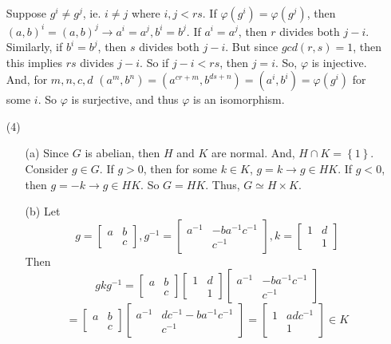 \begin{itemize}
Suppose $g^i \neq g^j$, ie. $i \neq j$ where $i, j < rs$. If $\varphi(g^i) = \varphi(g^j)$, then $(a, b)^i = (a, b)^j \rightarrow a^i = a^j, b^i = b^j$. If $a^i = a^j$, then $r$ divides both $j - i$. Similarly, if $b^i = b^j$, then $s$ divides both $j - i$. But since $gcd(r, s) = 1$, then this implies $rs$ divides $j - i$. So if $j - i < rs$, then $j = i$. So, $\varphi$ is injective. And, for $m, n, c, d$ $(a^m, b^n) = (a^{cr + m}, b^{ds + n}) = (a^i, b^i) = \varphi(g^i)$ for some $i$. So $\varphi$ is surjective, and thus $\varphi$ is an isomorphism.
\item[(4)]
\begin{itemize}
\item[(a)]
Since $G$ is abelian, then $H$ and $K$ are normal. And, $H \cap K = \left\lbrace 1 \right\rbrace$. Consider $g \in G$. If $g > 0$, then for some $k \in K$, $g = k \rightarrow g \in HK$. If $g < 0$, then $g = -k \rightarrow g \in HK$. So $G = HK$. Thus, $G \simeq H \times K$.
\item[(b)]
Let
$$g = \begin{bmatrix}
a & b \\
& c
\end{bmatrix}, g^{-1} = \begin{bmatrix}
a^{-1} & -ba^{-1}c^{-1} \\
& c^{-1}
\end{bmatrix}, k = \begin{bmatrix}
1 & d \\
& 1
\end{bmatrix}$$
Then
$$gkg^{-1} = \begin{bmatrix}
a & b \\
& c
\end{bmatrix}\begin{bmatrix}
1 & d \\
& 1
\end{bmatrix}\begin{bmatrix}
a^{-1} & -ba^{-1}c^{-1} \\
& c^{-1}
\end{bmatrix}$$
$$= \begin{bmatrix}
a & b \\
& c
\end{bmatrix}\begin{bmatrix}
a^{-1} & dc^{-1} - ba^{-1}c^{-1} \\
& c^{-1}
\end{bmatrix} = \begin{bmatrix}
1 & adc^{-1} \\
& 1
\end{bmatrix} \in K$$

\end{itemize}
\end{itemize}
